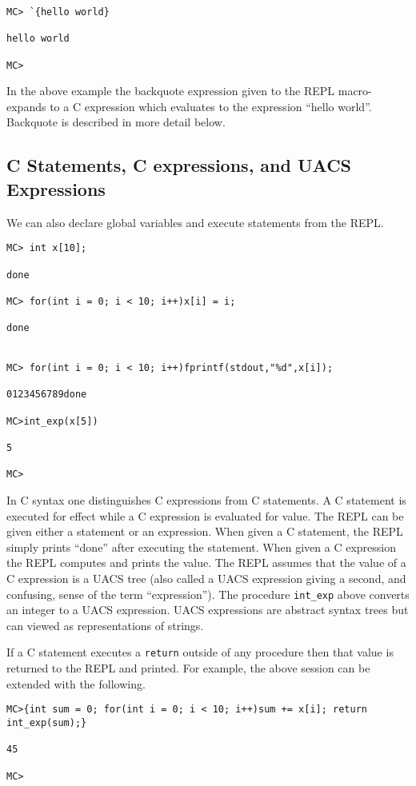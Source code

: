 \documentclass{article}
\begin{document}
\begin{verbatim}
MC> `{hello world}

hello world

MC>
\end{verbatim}

In the above example the backquote expression given to the REPL macro-expands to a C expression which evaluates to the expression ``hello world''.
Backquote is described in more detail below.

\subsection{C Statements, C expressions, and UACS Expressions}

We can also declare global variables and execute statements from the REPL.

\begin{verbatim}
MC> int x[10];

done

MC> for(int i = 0; i < 10; i++)x[i] = i;

done


MC> for(int i = 0; i < 10; i++)fprintf(stdout,"%d",x[i]);

0123456789done

MC>int_exp(x[5])

5

MC>
\end{verbatim}

In C syntax one distinguishes C expressions from C statements.  A C
statement is executed for effect while a C expression is evaluated for
value. The REPL can be given either a statement or an expression.  When
given a C statement, the REPL simply prints ``done'' after executing
the statement.
When given a C expression the REPL computes and prints
the value.  The REPL assumes that the value of a C expression
is a UACS tree (also called a UACS expression giving a second, and confusing,
sense of the term ``expression''). The procedure {\tt int\_exp} above
converts an integer to a UACS expression.  UACS expressions are abstract
syntax trees but can viewed as representations of strings.

If a C statement executes a {\tt return} outside of any
procedure then that value is returned to the REPL and printed.
For example, the above session can be extended with the following.

\begin{verbatim}
MC>{int sum = 0; for(int i = 0; i < 10; i++)sum += x[i]; return int_exp(sum);}

45

MC>
\end{verbatim}
\end{document}
